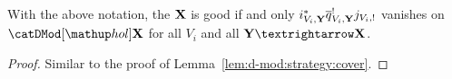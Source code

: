 \begin{Lem}\label{lem:d-mod:strategy:cover-by-relative-compactifications}
    With the above notation, the $\mathbf X$ is good if and only $i_{V_i,\mathbf Y}^* \overline q_{V_i,\mathbf Y}^! j_{V_i,!}$ vanishes on $\catDModHol{\stack X}$ for all $V_i$ and all $\stack Y → \stack X$.
\end{Lem}

\begin{proof}
    Similar to the proof of Lemma~\ref{lem:d-mod:strategy:cover}.
\end{proof}
